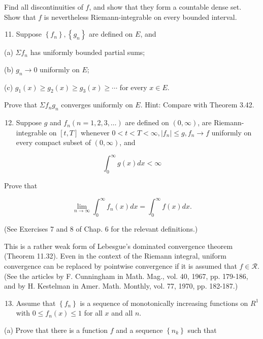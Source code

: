\documentclass[10pt]{article}
\begin{document}
Find all discontinuities of $f$, and show that they form a countable dense set. Show that $f$ is nevertheless Riemann-integrable on every bounded interval.

\begin{enumerate}
  \setcounter{enumi}{10}
  \item Suppose $\left\{f_{n}\right\},\left\{g_{n}\right\}$ are defined on $E$, and
\end{enumerate}

(a) $\Sigma f_{n}$ has uniformly bounded partial sums;

(b) $g_{n} \rightarrow 0$ uniformly on $E$;

(c) $g_{1}(x) \geq g_{2}(x) \geq g_{3}(x) \geq \cdots$ for every $x \in E$.

Prove that $\Sigma f_{n} g_{n}$ converges uniformly on $E$. Hint: Compare with Theorem 3.42.

\begin{enumerate}
  \setcounter{enumi}{11}
  \item Suppose $g$ and $f_{n}(n=1,2,3, \ldots)$ are defined on $(0, \infty)$, are Riemann-integrable on $[t, T]$ whenever $0<t<T<\infty,\left|f_{n}\right| \leq g, f_{n} \rightarrow f$ uniformly on every compact subset of $(0, \infty)$, and
\end{enumerate}

$$
\int_{0}^{\infty} g(x) d x<\infty
$$

Prove that

$$
\lim _{n \rightarrow \infty} \int_{0}^{\infty} f_{n}(x) d x=\int_{0}^{\infty} f(x) d x .
$$

(See Exercises 7 and 8 of Chap. 6 for the relevant definitions.)

This is a rather weak form of Lebesgue's dominated convergence theorem (Theorem 11.32). Even in the context of the Riemann integral, uniform convergence can be replaced by pointwise convergence if it is assumed that $f \in \mathscr{R}$. (See the articles by F. Cunningham in Math. Mag., vol. 40, 1967, pp. 179-186, and by H. Kestelman in Amer. Math. Monthly, vol. 77, 1970, pp. 182-187.)

\begin{enumerate}
  \setcounter{enumi}{12}
  \item Assume that $\left\{f_{n}\right\}$ is a sequence of monotonically increasing functions on $R^{1}$ with $0 \leq f_{n}(x) \leq 1$ for all $x$ and all $n$.
\end{enumerate}

(a) Prove that there is a function $f$ and a sequence $\left\{n_{k}\right\}$ such that
\end{document}
